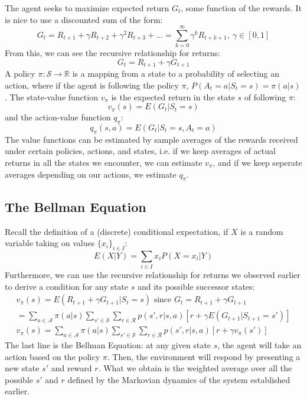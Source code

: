 \documentclass[12pt, reqno]{article}
\theoremstyle{plain}    \newtheorem{theorem}{Theorem}[section]
\theoremstyle{plain}    \newtheorem{lemma}[theorem]{Lemma}
\theoremstyle{plain}    \newtheorem{claim}[theorem]{Claim}
\theoremstyle{plain}    \newtheorem{definition}{Definition}[section]
\theoremstyle{plain}    \newtheorem{proposition}[theorem]{Proposition}
\theoremstyle{plain}    \newtheorem{corollary}[theorem]{Corollary}
\theoremstyle{plain}    \newtheorem{example}[definition]{Example}
\newcommand{\RR}{\mathbb R}
\numberwithin{equation}{section}
\begin{document}
The agent seeks to maximize expected return \(G_t\), some function of the
rewards. It is nice to use a discounted sum of the form:
\[G_t = R_{t+1} + \gamma R_{t+2} + \gamma^2 R_{t+3} + \dots =
\sum_{k=0}^{\infty}\gamma^k R_{t+k+1}, \ \gamma \in [0,1]\]
From this, we can see the recursive relationship for returns:
\[G_t = R_{t+1} + \gamma G_{t+1}\]
A policy \(\pi: \mathcal{S} \to \RR\) is a mapping from a state to a
probability of selecting an action, where if the agent is following the policy
\(\pi\), \(P(A_t = a | S_t = s) = \pi(a|s)\). The state-value function \(v_{\pi}\) is
the expected return in the state \(s\) of following \(\pi\): 
\[v_{\pi}(s) = E(G_t | S_t = s)\]
and the action-value function \(q_{\pi}\):
\[q_{\pi}(s,a) = E(G_t | S_t = s, A_t = a)\]
The value functions can be estimated by sample averages of the rewards received
under certain policies, actions, and states, i.e. if we keep averages of actual
returns in all the states we encounter, we can estimate \(v_{\pi}\), and if we keep seperate
averages depending on our actions, we estimate \(q_{\pi}\).

\subsection{The Bellman Equation}
Recall the definition of a (discrete) conditional expectation, if \(X\) is a
random variable taking on values \(\{x_i\}_{i \in I}\):
\[E(X|Y) = \sum_{i \in I} x_i P(X=x_i | Y)\]
Furthermore, we can use the recursive relationship for returns we observed
earlier to derive a condition for any state \(s\) and its possible successor
states:
\begin{gather*}
	v_{\pi}(s) = E(R_{t+1} + \gamma G_{t+1}|S_t = s) \text{ since } G_t = R_{t+1} + \gamma G_{t+1} \\
	= \sum_{a \in \mathcal{A}}\pi(a|s) \sum_{s' \in \mathcal{S}} \sum_{r \in \mathcal{R}}p(s', r | s,a) \left[r + \gamma E(G_{t+1} | S_{t+1} = s') \right] \\
	\boxed{v_{\pi}(s) = \sum_{a \in \mathcal{A}}\pi(a|s) \sum_{s' \in \mathcal{S}} \sum_{r \in \mathcal{R}}p(s', r | s,a) [r + \gamma v_{\pi}(s')]}
\end{gather*}
The last line is the Bellman Equation: at any given state \(s\), the agent will
take an action based on the policy \(\pi\). Then, the environment will respond
by presenting a new state \(s'\) and reward \(r\). What we obtain is the
weighted average over all the possible \(s'\) and \(r\) defined by the Markovian
dynamics of the system established earlier.
\end{document}
